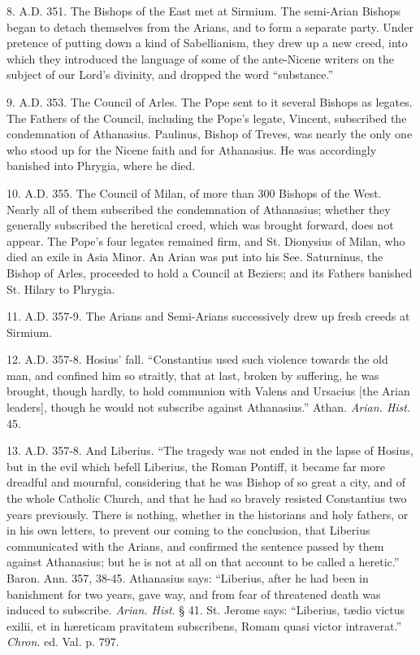 8. A.D. 351. The Bishops of the East met at
Sirmium. The semi-Arian Bishops began to detach themselves from the
Arians, and to form a separate party. Under pretence of putting down a
kind of Sabellianism, they drew up a new creed, into which they
introduced the language of some of the ante-Nicene writers on the
subject of our Lord's divinity, and dropped the word
``substance.''

9. A.D. 353. The Council of Arles. The Pope
sent to it several Bishops as legates. The Fathers of the
Council, including the Pope's legate, Vincent, subscribed the
condemnation of Athanasius. Paulinus, Bishop of Treves, was nearly the
only one who stood up for the Nicene faith and for Athanasius. He was
accordingly banished into Phrygia, where he died.

10. A.D. 355. The Council of Milan, of more
than 300 Bishops of the West. Nearly all of them subscribed the
condemnation of Athanasius; whether they generally subscribed the
heretical creed, which was brought forward, does not appear. The Pope's
four legates remained firm, and St. Dionysius of Milan, who died an
exile in Asia Minor. An Arian was put into his See. Saturninus, the
Bishop of Arles, proceeded to hold a Council at Beziers; and its
Fathers banished St. Hilary to Phrygia.

11. A.D. 357-9. The Arians and Semi-Arians
successively drew up fresh creeds at Sirmium.

12. A.D. 357-8. Hosius' fall. ``Constantius
used such violence towards the old man, and confined him so straitly,
that at last, broken by suffering, he was brought, though hardly, to
hold communion with Valens and Ursacius [the Arian leaders], though he
would not subscribe against Athanasius.'' Athan. \emph{Arian. Hist}.
45.

13. A.D. 357-8. And Liberius. ``The
tragedy was not ended in the lapse of Hosius, but in the evil which
befell Liberius, the Roman Pontiff, it became far more dreadful and
mournful, considering that he was Bishop of so great a city, and of
the whole Catholic Church, and that he had so bravely resisted
Constantius two years previously. There is nothing, whether in the
historians and holy fathers, or in his own letters, to prevent our
coming to the conclusion, that Liberius communicated with the Arians,
and confirmed the sentence passed by them against Athanasius; but he
is not at all on that account to be called a heretic.'' Baron.
Ann. 357, 38-45. Athanasius says: ``Liberius, after he had been
in banishment for two years, gave way, and from fear of
threatened death was induced to subscribe. \emph{Arian. Hist}. § 41.
St. Jerome says: ``Liberius, tædio victus exilii, et in
hæreticam pravitatem subscribens, Romam quasi victor intraverat.''
\emph{Chron}. ed. Val. p. 797.

